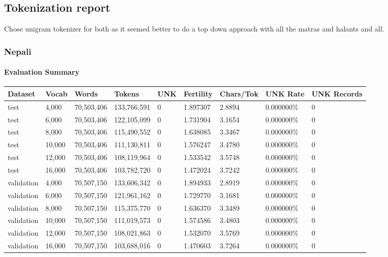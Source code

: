 \documentclass[10pt,a4paper]{article}
\begin{document}
\subsection{Tokenization report}
Chose unigram tokenizer for both as it seemed better to do a top down approach with all the matras and halants and all.
\subsubsection{Nepali}
\paragraph{Evaluation Summary}
\begin{center}
\small
\begin{longtable}{l l l l l l l l l}
\toprule
Dataset & Vocab & Words & Tokens & UNK & Fertility & Chars/Tok & UNK Rate & UNK Records \\
\midrule
\endhead
test & 4,000 & 70,503,406 & 133,766,591 & 0 & 1.897307 & 2.8894 & 0.000000\% & 0 \\
test & 6,000 & 70,503,406 & 122,105,099 & 0 & 1.731904 & 3.1654 & 0.000000\% & 0 \\
test & 8,000 & 70,503,406 & 115,490,552 & 0 & 1.638085 & 3.3467 & 0.000000\% & 0 \\
test & 10,000 & 70,503,406 & 111,130,811 & 0 & 1.576247 & 3.4780 & 0.000000\% & 0 \\
test & 12,000 & 70,503,406 & 108,119,964 & 0 & 1.533542 & 3.5748 & 0.000000\% & 0 \\
test & 16,000 & 70,503,406 & 103,782,720 & 0 & 1.472024 & 3.7242 & 0.000000\% & 0 \\
validation & 4,000 & 70,507,150 & 133,606,342 & 0 & 1.894933 & 2.8919 & 0.000000\% & 0 \\
validation & 6,000 & 70,507,150 & 121,961,162 & 0 & 1.729770 & 3.1681 & 0.000000\% & 0 \\
validation & 8,000 & 70,507,150 & 115,375,770 & 0 & 1.636370 & 3.3489 & 0.000000\% & 0 \\
validation & 10,000 & 70,507,150 & 111,019,573 & 0 & 1.574586 & 3.4803 & 0.000000\% & 0 \\
validation & 12,000 & 70,507,150 & 108,021,863 & 0 & 1.532070 & 3.5769 & 0.000000\% & 0 \\
validation & 16,000 & 70,507,150 & 103,688,016 & 0 & 1.470603 & 3.7264 & 0.000000\% & 0 \\
\bottomrule
\end{longtable}
\end{center}
\end{document}
